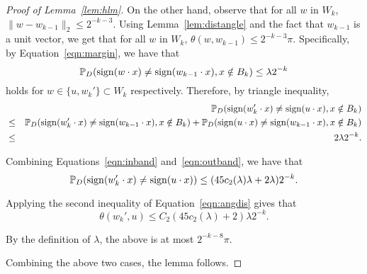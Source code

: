 \begin{proof}[Proof of Lemma~\ref{lem:hlm}]
On the other hand, observe that for all $w$ in $W_k$, $\| w - w_{k-1} \|_2 \leq 2^{-k-3}$.
Using Lemma~\ref{lem:distangle} and the fact that $w_{k-1}$ is a unit vector, we get that for all $w$ in $W_k$,
$ \theta(w,w_{k-1}) \leq 2^{-k-3}\pi. $
Specifically, by Equation~\eqref{eqn:margin}, we have that
	\[ \mathbb{P}_D(\operatorname{sign}(w \cdot x) \neq \operatorname{sign}(w_{k-1} \cdot x), x \notin B_k) \leq \lambda 2^{-k} \]
 holds for $w \in \{u, w_k'\} \subset W_k$ respectively. Therefore, by triangle inequality,
 \begin{eqnarray}
&& \mathbb{P}_D(\operatorname{sign}(w_k' \cdot x) \neq \operatorname{sign}(u \cdot x), x \notin B_k) \nonumber \\
&\leq& \mathbb{P}_D(\operatorname{sign}(w_k' \cdot x) \neq \operatorname{sign}(w_{k-1} \cdot x), x \notin B_k) +  \mathbb{P}_D(\operatorname{sign}(u \cdot x) \neq \operatorname{sign}(w_{k-1} \cdot x), x \notin B_k) \nonumber \\
&\leq& 2 \lambda 2^{-k}. \label{eqn:outband}
\end{eqnarray}




Combining Equations~\eqref{eqn:inband} and~\eqref{eqn:outband}, we have that
	\[ \mathbb{P}_D(\operatorname{sign}(w_k' \cdot x) \neq \operatorname{sign}(u \cdot x) ) \leq (45 c_2(\lambda) \lambda + 2 \lambda) 2^{-k}. \]

Applying the second inequality of Equation~\eqref{eqn:angdis} gives that
	\[ \theta(w_k', u) \leq C_2 (45 c_2(\lambda) + 2) \lambda 2^{-k}. \]

By the definition of $\lambda$, the above is at most $2^{-k-8} \pi$. %

Combining the above two cases, the lemma follows.
\end{proof}

